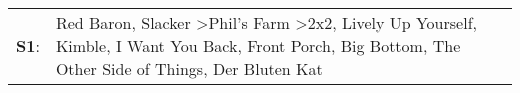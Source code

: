 \begin{supertabular}{p{0.03\textwidth}p{0.92\textwidth}}
 \textbf{S1}:  &  Red Baron\textsuperscript{}, \enspace Slacker\textsuperscript{} \textgreater \enspace Phil's Farm\textsuperscript{} \textgreater \enspace 2x2\textsuperscript{}, \enspace Lively Up Yourself\textsuperscript{}, \enspace Kimble\textsuperscript{}, \enspace I Want You Back\textsuperscript{}, \enspace Front Porch\textsuperscript{}, \enspace Big Bottom\textsuperscript{}, \enspace The Other Side of Things\textsuperscript{}, \enspace Der Bluten Kat\textsuperscript{}  \enspace  \\
\end{supertabular}
